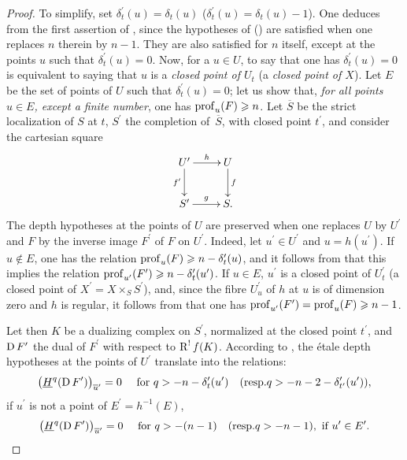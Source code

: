 \begin{proof}
To simplify, set $\delta_{t}^{\prime}(u)=\delta_{t}(u)$ (\resp $\delta_{t}^{\prime}(u)=\delta_{t}(u)-1$). One deduces from  the first assertion of , since the hypotheses of  (\resp {}) are satisfied when one replaces $n$ therein by $n-1$. They are also satisfied for $n$ itself, except at the points $u$ such that $\delta_{t}^{\prime}(u)=0$. Now, for a $u\in U$, to say that one has $\delta_{t}^{\prime}(u)=0$ is equivalent to saying that $u$ is a \emph{closed point of $U_{t}$} (\resp a \emph{closed point of $X$}). Let $E$ be the set of points of $U$ such that $\delta_{t}^{\prime}(u)=0$; let us show that, \emph{for all points $u\in E$, except a finite number}, one has $\operatorname{prof}_{u}(F)\geqslant n$. Let $\overline{S}$ be the strict localization of $S$ at $t$, $S^{\prime}$ the completion of~$\overline{S}$, with closed point $t^{\prime}$, and consider the cartesian square
$$
\xymatrix{ U^{\prime}\ar[r]^-{h}\ar[d]_-{f^{\prime}} & U\ar[d]^-{f}\\
S^{\prime}\ar[r]^-{g} & S.}$$
The depth hypotheses at the points of $U$ are preserved when one replaces $U$ by $U^{\prime}$ and $F$ by the inverse image $F^{\prime}$ of $F$ on $U^{\prime}$. Indeed, let $u^{\prime}\in U^{\prime}$ and $u=h(u^{\prime})$. If $u\not\in E$, one has the relation $\operatorname{prof}_{u}(F)\geqslant n-\delta_{t}^{\prime}(u)$, and it follows from  that this implies the relation $\operatorname{prof}_{u^{\prime}}(F^{\prime})\geqslant n-\delta_{t}^{\prime}(u^{\prime})$. If $u\in E$, $u^{\prime}$ is a closed point of $U_{t}^{\prime}$ (\resp a closed point of $X^{\prime}=X\times_{S}S^{\prime}$), and, since the fibre $U_{u}^{\prime}$ of $h$ at $u$ is of dimension zero and $h$ is regular, it follows from  that one has $\operatorname{prof}_{u^{\prime}}(F^{\prime})=\operatorname{prof}_{u}(F)\geqslant n-1$.

Let then $K$ be a dualizing complex on $S^{\prime}$, normalized at the closed point $t^{\prime}$, and $\operatorname{D} F^{\prime}$ the dual of $F^{\prime}$ with respect to $\operatorname{R}^{!}f(K)$. According to , the \'etale depth hypotheses at the points of $U^{\prime}$ translate into the relations:
$$
\big(\underline{H}^{q}(\operatorname{D} F^{\prime})\big)_{\overline{u}^{\prime}}=0\quad\textrm{ for }q>-n-\delta_{t}^{\prime}(u^{\prime})\quad(\textrm{resp.}q>-n-2-\delta_{t^{\prime}}^{\prime}(u^{\prime})),
$$
if $u^{\prime}$ is not a point of $E^{\prime}=h^{-1}(E)$,
$$
\big(\underline{H}^{q}(\operatorname{D} F^{\prime})\big)_{\overline{u}^{\prime}}=0\quad\textrm{ for }q>-(n-1)\quad(\textrm{resp.}q>-n-1), \textrm{ if }u^{\prime}\in E^{\prime}.
$$


\end{proof}
